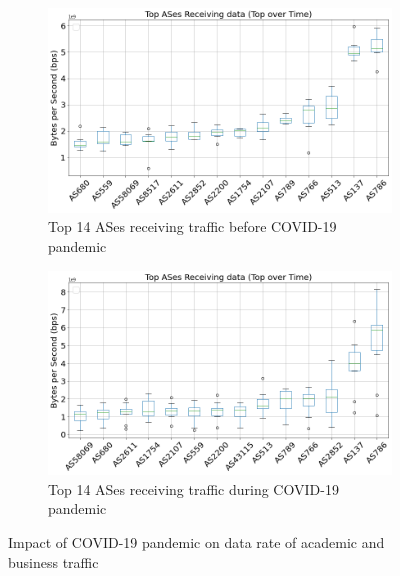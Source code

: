 \documentclass[10pt, journal, letterpaper]{IEEEtran}
\newcommand\linearFigSze{0.48}
\begin{document}
\begin{figure}
    \begin{subfigure}{\linearFigSze\textwidth}
          \centering
          \includegraphics[width=\columnwidth]{img/BCO2_top14AS_recieving_bps.png}
          \caption{Top 14 ASes receiving traffic before COVID-19 pandemic}
          \label{fig:BCO2_topAS_rec_bps}
    \end{subfigure}
    \begin{subfigure}{\linearFigSze\textwidth}
          \centering
          \includegraphics[width=\columnwidth]{img/CO2_top14AS_recieving_bps.png}
          \caption{Top 14 ASes receiving traffic during COVID-19 pandemic}
          \label{fig:CO2_topAS_rec_bps}
    \end{subfigure}
    \caption{Impact of COVID-19 pandemic on data rate of academic and business traffic}
    \label{fig:topAS_rec_BCO_CO}
\end{figure}
\end{document}
